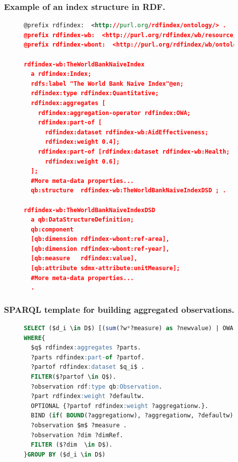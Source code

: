 \documentclass[xcolor=dvipsnames,dvip,notes=show,table]{beamer}
\begin{document}
\begin{frame}[fragile]
\frametitle{Example of an index structure in RDF.}
\begin{figure}[!ht]
\begin{lstlisting}[language=XML,basicstyle=\tiny]  
@prefix rdfindex:  <http://purl.org/rdfindex/ontology/> .
@prefix rdfindex-wb:  <http://purl.org/rdfindex/wb/resource/> .
@prefix rdfindex-wbont:  <http://purl.org/rdfindex/wb/ontology/> .

rdfindex-wb:TheWorldBankNaiveIndex 
  a rdfindex:Index;
  rdfs:label "The World Bank Naive Index"@en;
  rdfindex:type rdfindex:Quantitative;
  rdfindex:aggregates [ 		
    rdfindex:aggregation-operator rdfindex:OWA;
    rdfindex:part-of [
      rdfindex:dataset rdfindex-wb:AidEffectiveness; 
      rdfindex:weight 0.4];
    rdfindex:part-of [rdfindex:dataset rdfindex-wb:Health; 
      rdfindex:weight 0.6];
  ];
  #More meta-data properties...
  qb:structure 	rdfindex-wb:TheWorldBankNaiveIndexDSD ; .
  
rdfindex-wb:TheWorldBankNaiveIndexDSD 
  a qb:DataStructureDefinition;  
  qb:component    
  [qb:dimension rdfindex-wbont:ref-area],
  [qb:dimension rdfindex-wbont:ref-year],
  [qb:measure   rdfindex:value],
  [qb:attribute sdmx-attribute:unitMeasure];
  #More meta-data properties...
  .
\end{lstlisting}
 \label{fig:results-rdf-index}
\end{figure}
\end{frame}


\begin{frame}[fragile]
\frametitle{SPARQL template for building aggregated observations.}
\begin{figure}[!ht]
\begin{lstlisting}[language=SQL,basicstyle=\scriptsize,mathescape]  
SELECT ($d_i \in D$) [(sum(?w*?measure) as ?newvalue) | OWA(?measure)]
WHERE{
  $q$ rdfindex:aggregates ?parts.
  ?parts rdfindex:part-of ?partof.
  ?partof rdfindex:dataset $q_i$ .
  FILTER($?partof \in Q$).  
  ?observation rdf:type qb:Observation.
  ?part rdfindex:weight ?defaultw.     
  OPTIONAL {?partof rdfindex:weight ?aggregationw.}.
  BIND (if( BOUND(?aggregationw), ?aggregationw, ?defaultw) AS ?w)
  ?observation $m$ ?measure . 
  ?observation ?dim ?dimRef. 
  FILTER ($?dim  \in D$).
}GROUP BY ($d_i \in D$)
\end{lstlisting}
 \label{fig:results-rdf-sparql-template}
\end{figure}
\end{frame}
\end{document}
